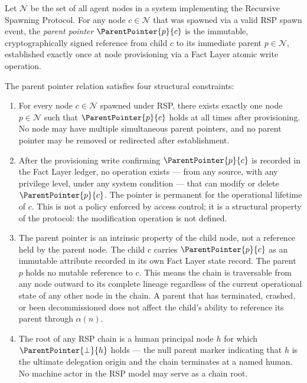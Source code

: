 \begin{definition}
\label{def:parent-pointer}
Let $\mathcal{N}$ be the set of all agent nodes in a \bxthree{} system implementing the Recursive Spawning Protocol. For any node $c \in \mathcal{N}$ that was spawned via a valid RSP spawn event, the \emph{parent pointer} $\ParentPointer{p}{c}$ is the immutable, cryptographically signed reference from child $c$ to its immediate parent $p \in \mathcal{N}$, established exactly once at node provisioning via a Fact Layer atomic write operation.

The parent pointer relation satisfies four structural constraints:

\begin{enumerate}
    \item[(P1) \textbf{Uniqueness}] For every node $c \in \mathcal{N}$ spawned under RSP, there exists exactly one node $p \in \mathcal{N}$ such that $\ParentPointer{p}{c}$ holds at all times after provisioning. No node may have multiple simultaneous parent pointers, and no parent pointer may be removed or redirected after establishment.

    \item[(P2) \textbf{Immutability}] After the provisioning write confirming $\ParentPointer{p}{c}$ is recorded in the Fact Layer ledger, no operation exists --- from any source, with any privilege level, under any system condition --- that can modify or delete $\ParentPointer{p}{c}$. The pointer is permanent for the operational lifetime of $c$. This is not a policy enforced by access control; it is a structural property of the protocol: the modification operation is not defined.

    \item[(P3) \textbf{Directionality}] The parent pointer is an intrinsic property of the child node, not a reference held by the parent node. The child $c$ carries $\ParentPointer{p}{c}$ as an immutable attribute recorded in its own Fact Layer state record. The parent $p$ holds no mutable reference to $c$. This means the chain is traversable from any node outward to its complete lineage regardless of the current operational state of any other node in the chain. A parent that has terminated, crashed, or been decommissioned does not affect the child's ability to reference its parent through $\alpha(n)$.

    \item[(P4) \textbf{Termination at Human Anchor}] The root of any RSP chain is a human principal node $h$ for which $\ParentPointer{\bot}{h}$ holds --- the null parent marker indicating that $h$ is the ultimate delegation origin and the chain terminates at a named human. No machine actor in the RSP model may serve as a chain root.
\end{enumerate}
\end{definition}


